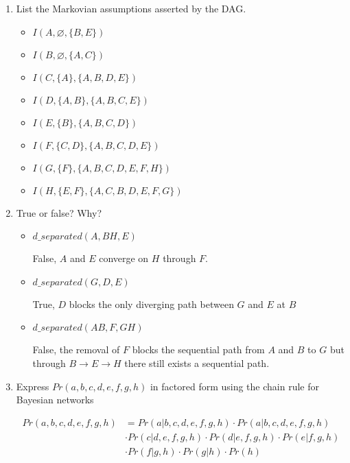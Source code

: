 \documentclass[12pt]{article}
\begin{document}
\begin{enumerate}
	\begin{enumerate}
		\item List the Markovian assumptions asserted by the DAG.

		\begin{itemize}
			\item $I(A, \varnothing, \{B, E\})$
			\item $I(B, \varnothing, \{A, C\})$
			\item $I(C, \{A\}, \{A, B, D, E\})$
			\item $I(D, \{A, B\}, \{A, B, C, E\})$
			\item $I(E, \{B\}, \{A, B, C, D\})$
			\item $I(F, \{C, D\}, \{A, B, C, D, E\})$
			\item $I(G, \{F\}, \{A, B, C, D, E, F, H\})$
			\item $I(H, \{E, F\}, \{A, C, B, D, E, F, G\})$
		\end{itemize}

		\item True or false? Why?

		\begin{itemize}
			\item $d\_separated(A, BH, E)$

			False, $A$ and $E$ converge on $H$ through $F$.

			\item $d\_separated(G, D, E)$

			True, $D$ blocks the only diverging path between $G$ and $E$ at $B$

			\item $d\_separated(AB, F, GH)$

			False, the removal of $F$ blocks the sequential path from $A$ and $B$ to $G$ but through $B \rightarrow E \rightarrow H$ there still exists a sequential path.
		\end{itemize}

		\item Express $Pr(a, b, c, d, e, f, g, h)$ in factored form using the chain rule for Bayesian networks

		\begin{align*}
		Pr(a, b, c, d, e, f, g, h) &= Pr(a | b, c, d, e, f, g, h) \cdot Pr(a | b, c, d, e, f, g, h) \\
		& \cdot Pr(c | d, e, f, g, h) \cdot Pr(d | e, f, g, h) \cdot Pr(e | f, g, h) \\
		& \cdot Pr(f | g, h) \cdot Pr(g | h) \cdot Pr(h) \\
		\end{align*}


\end{enumerate}
\end{enumerate}
\end{document}
